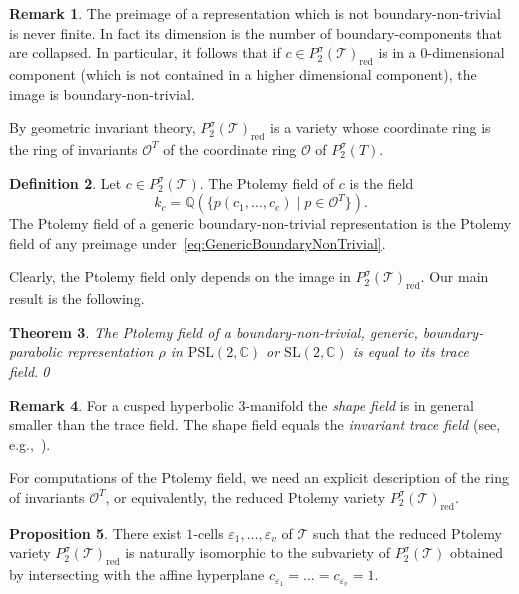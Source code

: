 \documentclass[12pt]{amsart}
\newtheorem{theorem}{Theorem}[section]
\theoremstyle{definition}
\newtheorem{proposition}[theorem]{Proposition}
\newtheorem{definition}[theorem]{Definition}
\newtheorem{remark}[theorem]{Remark}
\numberwithin{equation}{section}
\def\SL{\mathrm{SL}}
\def\PSL{\mathrm{PSL}}
\def\C{\mathbb{C}}
\def\Q{\mathbb{Q}}
\def\T{\mathcal{T}}
\def\rd{\mathrm{red}}
\begin{document}
\begin{remark}\label{rm:HigherComponents}
The preimage of a representation which is not boundary-non-trivial is never finite. In fact its dimension is the number of boundary-components that are collapsed. In particular, it follows that if $c\in P_2^{\sigma}(\T)_{\rd}$ is in a $0$-dimensional component (which is not contained in a higher dimensional component), the image is boundary-non-trivial.
\end{remark}

By geometric invariant theory, $P^\sigma_2(\T)_\rd$ is a variety whose coordinate ring is the ring of invariants $\mathcal O^T$ of the coordinate ring $\mathcal O$ of $P^\sigma_2(T)$.

\begin{definition}\label{def:PtolemyField}
Let $c\in P^\sigma_2(\T)$. The Ptolemy field of $c$ is the field
\begin{equation}
k_c=\Q\left(\big\{p(c_1,\dots,c_e)\mid p\in\mathcal O^T\big\}\right).
\end{equation}
The Ptolemy field of a generic boundary-non-trivial representation is the Ptolemy field of any preimage under~\eqref{eq:GenericBoundaryNonTrivial}.
\end{definition}
Clearly, the Ptolemy field only depends on the image in $P^\sigma_2(\T)_\rd$. Our main result is the following.
\begin{theorem}\label{thm:PtolemyFieldEqualsTraceField}
The Ptolemy field of a boundary-non-trivial, generic, boundary-parabolic representation $\rho$ in $\PSL(2,\C)$ or $\SL(2,\C)$ is equal to its trace field.\qed
\end{theorem}
\begin{remark}
For a cusped hyperbolic $3$-manifold the \emph{shape field} is in general smaller than the trace field. The shape field equals the \emph{invariant trace field} (see, e.g.,~\cite{MaclachlanReid}).
\end{remark}
For computations of the Ptolemy field, we need an explicit description of the ring of invariants $\mathcal O^T$, or equivalently, the reduced Ptolemy variety $P^\sigma_2(\T)_\rd$.
\begin{proposition}\label{prop:FixDecoration}
There exist $1$-cells $\varepsilon_1,\dots,\varepsilon_v$ of $\T$ such that the reduced Ptolemy variety $P_2^{\sigma}(\T)_{\rd}$ is naturally isomorphic to the subvariety of $P^\sigma_2(\T)$ obtained by intersecting with the affine hyperplane $c_{\varepsilon_1}=\dots=c_{\varepsilon_v}=1$. %
\end{proposition}
\end{document}
